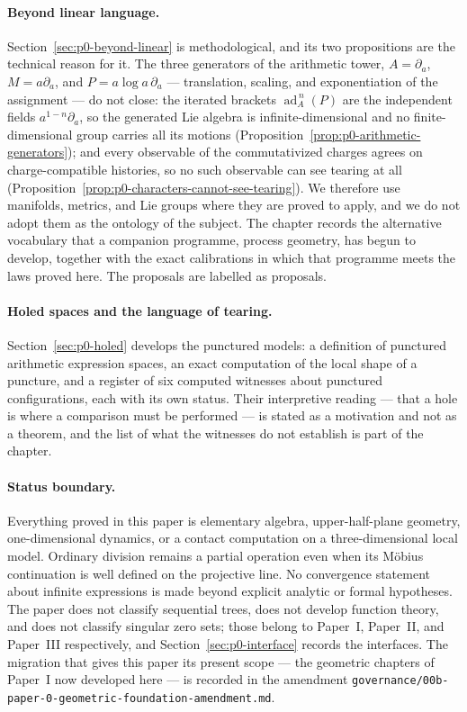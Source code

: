 \paragraph{Beyond linear language.}
Section~\ref{sec:p0-beyond-linear} is methodological, and its two propositions
are the technical reason for it.  The three generators of the arithmetic tower,
$A=\partial_a$, $M=a\partial_a$, and $P=a\log a\,\partial_a$ --- translation,
scaling, and exponentiation of the assignment --- do not close: the iterated
brackets $\operatorname{ad}_A^{\,n}(P)$ are the independent fields
$a^{1-n}\partial_a$, so the generated Lie algebra is infinite-dimensional and no
finite-dimensional group carries all its motions
(Proposition~\ref{prop:p0-arithmetic-generators}); and every observable of the
commutativized charges agrees on charge-compatible histories, so no such
observable can see tearing at all
(Proposition~\ref{prop:p0-characters-cannot-see-tearing}).  We therefore use
manifolds, metrics, and Lie groups where they are
proved to apply, and we do not adopt them as the ontology of the subject.  The
chapter records the alternative vocabulary that a companion programme, process
geometry, has begun to develop, together with the exact calibrations in which
that programme meets the laws proved here.  The proposals are labelled as
proposals.

\paragraph{Holed spaces and the language of tearing.}
Section~\ref{sec:p0-holed} develops the punctured models: a
definition of punctured arithmetic expression spaces, an exact computation of
the local shape of a puncture, and a register of six computed witnesses about
punctured configurations, each with its own status.  Their interpretive reading
--- that a hole is where a comparison must be performed --- is stated as a
motivation and not as a theorem, and the list of what the witnesses do not
establish is part of the chapter.

\paragraph{Status boundary.}
Everything proved in this paper is elementary algebra, upper-half-plane
geometry, one-dimensional dynamics, or a contact computation on a
three-dimensional local model.  Ordinary division remains a partial operation
even when its M\"obius continuation is well defined on the projective line.  No
convergence statement about infinite expressions is made beyond explicit
analytic or formal hypotheses.  The paper does not classify sequential trees,
does not develop function theory, and does not classify singular zero sets;
those belong to Paper~I, Paper~II, and Paper~III respectively, and
Section~\ref{sec:p0-interface} records the interfaces.  The migration that gives
this paper its present scope --- the geometric chapters of Paper~I now developed
here --- is recorded in the amendment
\texttt{governance/00b-paper-0-geometric-foundation-amendment.md}.

